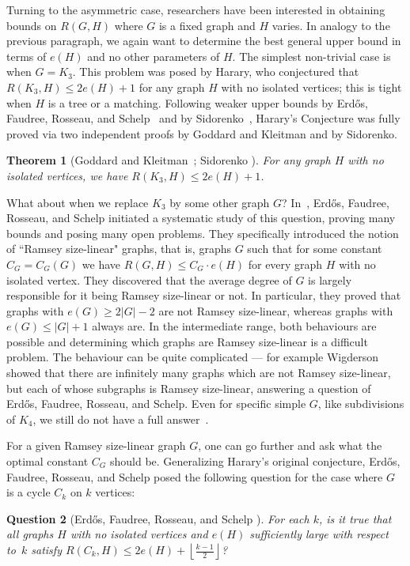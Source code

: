 \documentclass{article}
\newtheorem{theorem}{Theorem}
\newtheorem{ques}[theorem]{Question}
\newcommand*{\floorfrac}[2]{\mathopen{}\left\lfloor\frac{#1}{#2}\right\rfloor\mathclose{}}
\begin{document}
    Turning to the asymmetric case, researchers have been interested in obtaining bounds on $R(G,H)$ where $G$ is a fixed graph and $H$ varies. 
    In analogy to the previous paragraph, we again want to determine the best general upper bound in terms of $e(H)$ and no other parameters of $H$. 
    The simplest non-trivial case is when $G=K_3$.
    This problem was posed by Harary, who conjectured that $R(K_3, H)\le 2e(H)+1$ for any graph $H$ with no isolated vertices; this is tight when $H$ is a tree or a matching.
    Following weaker upper bounds by Erd\H{o}s, Faudree, Rosseau, and Schelp~\cite{erdos1987ramsey} and by Sidorenko~\cite{sidorenko1991upper}, Harary's Conjecture was fully proved via two independent proofs by  Goddard and Kleitman and by Sidorenko.
    \begin{theorem}[Goddard and Kleitman~\cite{goddard1994upper}; Sidorenko \cite{Sidorenko93}]\label{Theorem_triangle}
        For any graph $H$ with no isolated vertices, we have $R(K_3, H)\le 2e(H)+1$.
    \end{theorem}
    
    What about when we replace $K_3$ by some other graph $G$? 
    In~\cite{EFRS93}, Erd\H{o}s, Faudree, Rosseau, and Schelp initiated a systematic study of this question, proving many bounds and posing many open problems.
    They specifically introduced the notion of ``Ramsey size-linear" graphs, that is, graphs $G$ such that for some constant $C_G=C_G(G)$ we have $R(G,H)\le C_G\cdot e(H)$ for every graph $H$ with no isolated vertex.
    They discovered that the average degree of $G$ is largely responsible for it being Ramsey size-linear or not.
    In particular, they proved that graphs with $e(G)\ge 2|G|-2$ are not Ramsey size-linear, whereas graphs with $e(G)\le |G|+1$ always are.
    In the intermediate range, both behaviours are possible and determining which graphs are Ramsey size-linear is a difficult problem. The behaviour can be quite complicated --- for example Wigderson~\cite{Wigderson24+} showed that there are infinitely many graphs which are not Ramsey size-linear, but each of whose subgraphs is Ramsey size-linear, answering a question of Erd\H{o}s, Faudree, Rosseau, and Schelp. Even for specific simple $G$, like subdivisions of $K_4$, we still do not have a full answer~\cite{balister2002note,bradavc2024ramsey}. 

   For a given Ramsey size-linear graph $G$, one can go further and ask what the optimal constant $C_G$ should be.
   Generalizing Harary's original conjecture, Erd\H{o}s, Faudree, Rosseau, and Schelp posed the following question for the case where $G$ is a cycle $C_k$ on $k$ vertices:
   \begin{ques}[Erd\H{o}s, Faudree, Rosseau, and Schelp \cite{EFRS93}]\label{Conjecture_EFRS}
   For each $k$, is it true that all graphs $H$ with no isolated vertices and $e(H)$ sufficiently large with respect to~$k$ satisfy $R(C_k,H)\le 2e(H)+\floorfrac{k-1}{2} $?
    \end{ques}
\end{document}

